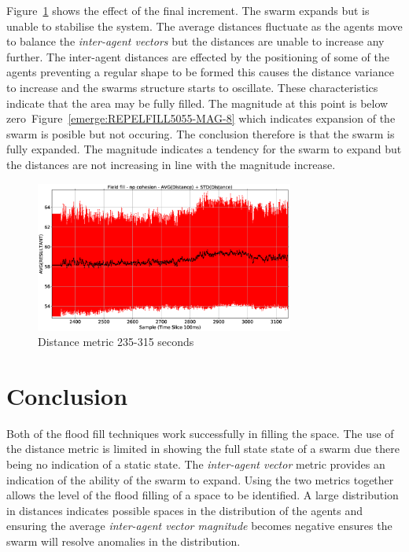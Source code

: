 \documentclass[10pt,journal,letterpaper,twoside]{IEEEtran}
\begin{document}
Figure~\ref{emerge:REPELFILL5055-DIST-8} shows the effect of the final increment. The swarm expands but is unable to stabilise the system. The average distances fluctuate as the agents move to balance the \textit{inter-agent vectors} but the distances are unable to increase any further. The inter-agent distances are effected by the positioning of some of the agents preventing a regular shape to be formed this causes the distance variance to increase and the swarms structure starts to oscillate. These characteristics indicate that the area may be fully filled. The magnitude at this point is below zero~Figure~\ref{emerge:REPELFILL5055-MAG-8} which indicates expansion of the swarm is posible but not occuring. The conclusion therefore is that the swarm is fully expanded. The magnitude indicates a tendency for the swarm to expand but the distances are not increasing in line with the magnitude increase. 

\begin{figure}
\begin{center}
\includegraphics[width=8.5cm]{figures/REPELFILL5055-DIST-8}
\end{center}
\caption{Distance metric 235-315 seconds\label{emerge:REPELFILL5055-DIST-8}}
\end{figure}

\section{Conclusion}
Both of the flood fill techniques work successfully in filling the space. The use of the distance metric is limited in showing the full state state of a swarm due there being no indication of a static state. The \textit{inter-agent vector} metric provides an indication of the ability of the swarm to expand. Using the two metrics together allows the level of the flood filling of a space to be identified. A large distribution in distances indicates possible spaces in the distribution of the agents and ensuring the average \textit{inter-agent vector magnitude} becomes negative ensures the swarm will resolve anomalies in the distribution.
\end{document}
